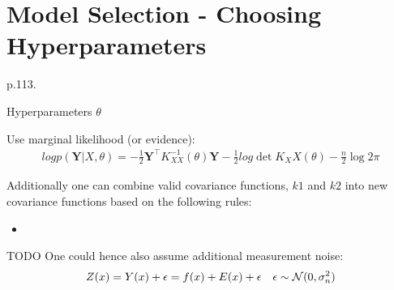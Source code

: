 \section{Model Selection - Choosing Hyperparameters}
\citeauthor{rasmussen_gaussian_2006} p.113.

Hyperparameters $\theta$

Use marginal likelihood (or evidence):
\begin{gather}
    log p(\mathbf{Y} | X, \theta) = - \frac{1}{2} \mathbf{Y}^{\top} K_{XX}^{-1}(\theta) \mathbf{Y} -
    \frac{1}{2} log \det{K_XX(\theta)} - \frac{n}{2} \log 2 \pi
\end{gather}



%
%

Additionally one can combine valid covariance functions, $k1$ and $k2$ into new covariance functions based on the following rules:
\begin{itemize}
    \item
\end{itemize}



TODO
One could hence also assume additional measurement noise:
\begin{align*}
    Z(x) = Y(x) + \epsilon = f(x) + E(x) + \epsilon  && \epsilon \sim \operatorname{\mathcal{N}}(0, \sigma_n^{2})
\end{align*}




